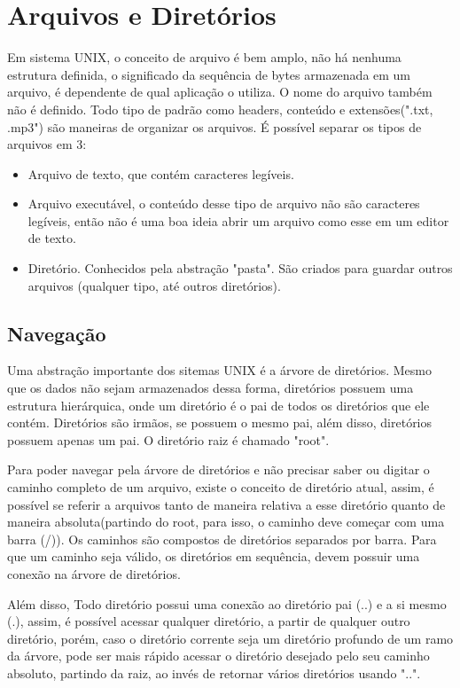 	\section{Arquivos e Diretórios}
	Em sistema UNIX, o conceito de arquivo é bem amplo, não há nenhuma estrutura definida, o significado da sequência de bytes armazenada em um arquivo, é dependente de qual aplicação o utiliza. O nome do arquivo também não é definido. Todo tipo de padrão como headers, conteúdo e extensões(".txt, .mp3") são maneiras de organizar os arquivos. É possível separar os tipos de arquivos em 3:
	\begin{itemize}
		\item Arquivo de texto, que contém caracteres legíveis.
		\item Arquivo executável, o conteúdo desse tipo de arquivo não são caracteres legíveis, então não é uma boa ideia abrir um arquivo como esse em um editor de texto.
		\item Diretório. Conhecidos pela abstração "pasta". São criados para guardar outros arquivos (qualquer tipo, até outros diretórios).
	\end{itemize}
	\subsection{Navegação}
	Uma abstração importante dos sitemas UNIX é a árvore de diretórios. Mesmo que os dados não sejam armazenados dessa forma, diretórios possuem uma estrutura hierárquica, onde um diretório é o pai de todos os diretórios que ele contém. Diretórios são irmãos, se possuem o mesmo pai, além disso, diretórios possuem apenas um pai. O diretório raiz é chamado "root".
	
	Para poder navegar pela árvore de diretórios e não precisar saber ou digitar o caminho completo de um arquivo, existe o conceito de diretório atual, assim, é possível se referir a arquivos tanto de maneira relativa a esse diretório quanto de maneira absoluta(partindo do root, para isso, o caminho deve começar com uma barra (/)). Os caminhos são compostos de diretórios separados por barra. Para que um caminho seja válido, os diretórios em sequência, devem possuir uma conexão na árvore de diretórios.
	
	Além disso, Todo diretório possui uma conexão ao diretório pai (..) e a si mesmo (.), assim, é possível acessar qualquer diretório, a partir de qualquer outro diretório, porém, caso o diretório corrente seja um diretório profundo de um ramo da árvore, pode ser mais rápido acessar o diretório desejado pelo seu caminho absoluto, partindo da raiz, ao invés de retornar vários diretórios usando "..".
	
